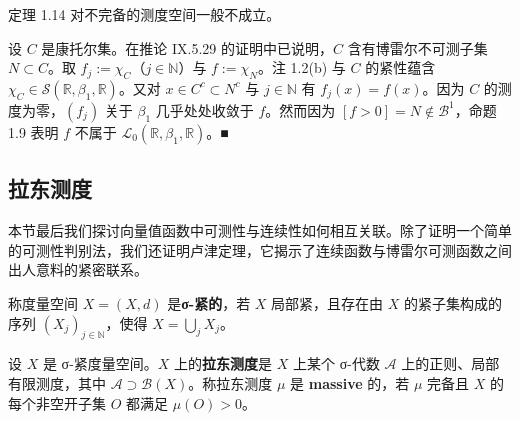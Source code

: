 \begin{remark}

定理 1.14 对不完备的测度空间一般不成立。

\proofhead
设 $ C $ 是康托尔集。在推论 IX.5.29 的证明中已说明，$ C $ 含有博雷尔不可测子集 $ N \subset C $。取 $ f_j := \chi_C $（$ j \in \mathbb{N} $）与 $ f := \chi_N $。注 1.2(b) 与 $ C $ 的紧性蕴含 $ \chi_C \in \mathcal{S}(\mathbb{R},\beta_1,\mathbb{R}) $。又对 $ x \in C^c \subset N^c $ 与 $ j \in \mathbb{N} $ 有 $ f_j(x) = f(x) $。因为 $ C $ 的测度为零，$ (f_j) $ 关于 $ \beta_1 $ 几乎处处收敛于 $ f $。然而因为 $ [f > 0] = N \notin \mathcal{B}^1 $，命题 1.9 表明 $ f $ 不属于 $ \mathcal{L}_0(\mathbb{R},\beta_1,\mathbb{R}) $。\nobreak\hspace{0.35em}■
\end{remark}

\subsection*{拉东测度}

本节最后我们探讨向量值函数中可测性与连续性如何相互关联。除了证明一个简单的可测性判别法，我们还证明卢津定理，它揭示了连续函数与博雷尔可测函数之间出人意料的紧密联系。

称度量空间 $ X = (X,d) $ 是\textbf{σ-紧的}，若 $ X $ 局部紧，且存在由 $ X $ 的紧子集构成的序列 $ (X_j)_{j\in\mathbb{N}} $，使得 $ X = \bigcup_j X_j $。

设 $ X $ 是 σ-紧度量空间。$ X $ 上的\textbf{拉东测度}是 $ X $ 上某个 σ-代数 $ \mathcal{A} $ 上的正则、局部有限测度，其中 $ \mathcal{A} \supset \mathcal{B}(X) $。称拉东测度 $ \mu $ 是 \textbf{massive} 的，若 $ \mu $ 完备且 $ X $ 的每个非空开子集 $ O $ 都满足 $ \mu(O) > 0 $。

